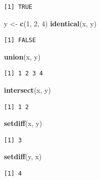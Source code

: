 \documentclass[11pt,a4paper]{book}
\newenvironment{Shaded}{\begin{snugshade}}{\end{snugshade}}
\newcommand{\KeywordTok}[1]{\textcolor[rgb]{0.13,0.29,0.53}{\textbf{#1}}}
\newcommand{\DecValTok}[1]{\textcolor[rgb]{0.00,0.00,0.81}{#1}}
\newcommand{\StringTok}[1]{\textcolor[rgb]{0.31,0.60,0.02}{#1}}
\newcommand{\NormalTok}[1]{#1}
\theoremstyle{definition}
\theoremstyle{definition}
\theoremstyle{definition}
\theoremstyle{remark}
\begin{document}
\begin{verbatim}
[1] TRUE
\end{verbatim}

\begin{Shaded}
\begin{Highlighting}[]
\NormalTok{y <-}\StringTok{ }\KeywordTok{c}\NormalTok{(}\DecValTok{1}\NormalTok{, }\DecValTok{2}\NormalTok{, }\DecValTok{4}\NormalTok{)}
\KeywordTok{identical}\NormalTok{(x, y)}
\end{Highlighting}
\end{Shaded}

\begin{verbatim}
[1] FALSE
\end{verbatim}

\begin{Shaded}
\begin{Highlighting}[]
\KeywordTok{union}\NormalTok{(x, y)}
\end{Highlighting}
\end{Shaded}

\begin{verbatim}
[1] 1 2 3 4
\end{verbatim}

\begin{Shaded}
\begin{Highlighting}[]
\KeywordTok{intersect}\NormalTok{(x, y)}
\end{Highlighting}
\end{Shaded}

\begin{verbatim}
[1] 1 2
\end{verbatim}

\begin{Shaded}
\begin{Highlighting}[]
\KeywordTok{setdiff}\NormalTok{(x, y)}
\end{Highlighting}
\end{Shaded}

\begin{verbatim}
[1] 3
\end{verbatim}

\begin{Shaded}
\begin{Highlighting}[]
\KeywordTok{setdiff}\NormalTok{(y, x)}
\end{Highlighting}
\end{Shaded}

\begin{verbatim}
[1] 4
\end{verbatim}
\end{document}
